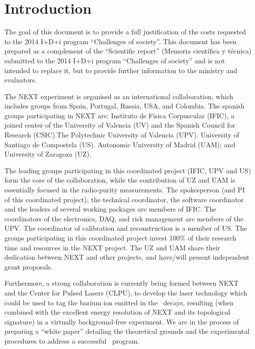 \documentclass[a4paper,11pt,oneside]{article}
\begin{document}
\section{\bf Introduction}
\label{sec.intro}
The goal of this document is to provide a full justification of the costs requested to the 2014 I+D+i program
``Challenges of society''. This document has been prepared as a complement of the ``Scientific report'' (Memoria científica y técnica) submitted to the 2014 I+D+i program
``Challenges of society'' and is not intended to replace it, but to provide further information to the ministry and evaluators. 

The NEXT experiment is organised as an international collaboration, which includes groups from Spain, Portugal, Russia, USA, and Colombia. The spanish groups participating in NEXT are: Instituto de Física Corpuscular (IFIC), a joined center of the University of Valencia (UV) and the Spanish Council for Research (CSIC).The  Polytechnic University of Valencia (UPV). University of Santiago de Compostela (US). Autonomic University of Madrid (UAM); and University of Zaragoza (UZ). 

The leading groups participating in this coordinated project (IFIC, UPV and US) form the core of the collaboration, while the contribution of UZ and UAM is essentially focused in the radio-purity measurements. The spokesperson (and PI of this coordinated project), the technical coordinator, the software coordinator and the leaders of several working  packages are members of IFIC. The coordinators of the electronics, DAQ, and risk management are members of the UPV. The coordinator of calibration and reconstruction is a member of US. The groups participating in this coordinated project invest 100\% of their research time and resources in the NEXT project. The UZ and UAM share their dedication between NEXT and other projects, and have/will present independent grant proposals.

Furthermore, a strong collaboration is currently being formed between NEXT and the Center for Pulsed Lasers (CLPU), to develop the laser technology which could be used to tag the barium ion emitted in the \bb\ decays, resulting (when combined with the excellent energy resolution of NEXT and its topological signature) in a virtually background-free experiment. We are in the process of preparing a ``white paper'' detailing the theoretical grounds and the experimental procedures to address a successful  \BATA\ program. 
\end{document}
